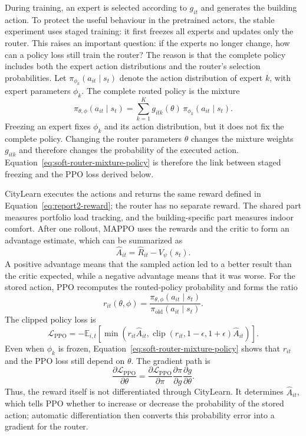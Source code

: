During training, an expert is selected according to $g_{it}$ and generates the
building action. To protect the useful behaviour in the pretrained actors, the
stable experiment uses staged training: it first freezes all experts and updates
only the router. This raises an important question: if the experts no longer
change, how can a policy loss still train the router? The reason is that the
complete policy includes both the expert action distributions and the router's
selection probabilities. Let $\pi_{\phi_k}(a_{it}\mid s_t)$ denote the action
distribution of expert $k$, with expert parameters $\phi_k$. The complete routed
policy is the mixture
\begin{equation}
\pi_{\theta,\phi}(a_{it}\mid s_t)
=\sum_{k=1}^{K}g_{itk}(\theta)\,
\pi_{\phi_k}(a_{it}\mid s_t).
\label{eq:soft-router-mixture-policy}
\end{equation}
Freezing an expert fixes $\phi_k$ and its action distribution, but it does not
fix the complete policy. Changing the router parameters $\theta$ changes the
mixture weights $g_{itk}$ and therefore changes the probability of the executed
action. Equation~\eqref{eq:soft-router-mixture-policy} is therefore the link
between staged freezing and the PPO loss derived below.

CityLearn executes the actions and returns the same reward defined in
Equation~\eqref{eq:report2-reward}; the router has no separate reward. The shared
part measures portfolio load tracking, and the building-specific part measures
indoor comfort. After one rollout, MAPPO uses the rewards and the critic to form
an advantage estimate, which can be summarized as
\begin{equation}
\hat A_{it}=\hat R_{it}-V_{\psi}(s_t).
\end{equation}
A positive advantage means that the sampled action led to a better result than
the critic expected, while a negative advantage means that it was worse. For the
stored action, PPO recomputes the routed-policy probability and forms the ratio
\begin{equation}
r_{it}(\theta,\phi)=
\frac{\pi_{\theta,\phi}(a_{it}\mid s_t)}
{\pi_{\mathrm{old}}(a_{it}\mid s_t)}.
\end{equation}
The clipped policy loss is
\begin{equation}
\mathcal{L}_{\mathrm{PPO}}
=-\mathbb{E}_{i,t}\!\left[
\min\!\left(
r_{it}\hat A_{it},
\operatorname{clip}(r_{it},1-\epsilon,1+\epsilon)\hat A_{it}
\right)
\right].
\label{eq:soft-router-ppo-loss}
\end{equation}
Even when $\phi_k$ is frozen, Equation~\eqref{eq:soft-router-mixture-policy}
shows that $r_{it}$ and the PPO loss still depend on $\theta$. The gradient path is
\begin{equation}
\frac{\partial\mathcal{L}_{\mathrm{PPO}}}{\partial\theta}
=\frac{\partial\mathcal{L}_{\mathrm{PPO}}}{\partial\pi}
\frac{\partial\pi}{\partial g}
\frac{\partial g}{\partial\theta}.
\end{equation}
Thus, the reward itself is not differentiated through CityLearn. It determines
$\hat A_{it}$, which tells PPO whether to increase or decrease the probability of
the stored action; automatic differentiation then converts this probability
error into a gradient for the router.

